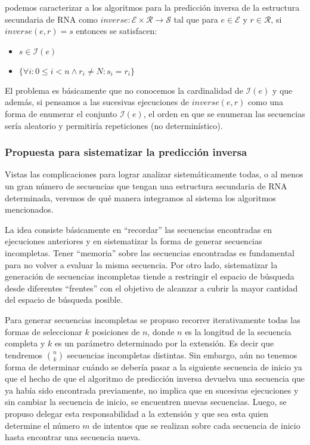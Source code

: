 podemos caracterizar a los algoritmos para la predicci\'on inversa de la
estructura secundaria de \ac{RNA} como $inverse: \mathcal{E} \times \mathcal{R}
\rightarrow \mathcal{S}$ tal que para $e \in \mathcal{E}$ y $r \in
\mathcal{R}$, si $inverse(e,r) = s$ entonces se satisfacen:

\begin{itemize}
  \item $s \in \mathcal{I}(e)$
  \item $\{\forall i : 0 \leq i < n \land r_{i} \neq N : s_{i} = r_{i}\}$ 
\end{itemize}

El problema es b\'asicamente que no conocemos la cardinalidad de
$\mathcal{I}(e)$ y que adem\'as, si pensamos a las sucesivas ejecuciones de
$inverse(e,r)$ como una forma de enumerar el conjunto $\mathcal{I}(e)$, el orden
en que se enumeran las secuencias ser\'ia aleatorio y permitir\'ia repeticiones
(no determin\'istico).

\subsubsection{Propuesta para sistematizar la predicci\'on inversa}

Vistas las complicaciones para lograr analizar sistem\'aticamente todas, o al
menos un gran n\'umero de secuencias que tengan una estructura secundaria de
\ac{RNA} determinada, veremos de qu\'e manera integramos al sistema los
algoritmos mencionados.

La idea consiste b\'asicamente en ``recordar'' las secuencias encontradas en
ejecuciones anteriores y en sistematizar la forma de generar secuencias
incompletas. Tener ``memoria'' sobre las secuencias encontradas es fundamental
para no volver a evaluar la misma secuencia. Por otro lado, sistematizar la
generaci\'on de secuencias incompletas tiende a restringir el espacio de
b\'usqueda desde diferentes ``frentes'' con el objetivo de alcanzar a cubrir la
mayor cantidad del espacio de b\'usqueda posible.

Para generar secuencias incompletas se propuso recorrer iterativamente todas
las formas de seleccionar $k$ posiciones de $n$, donde $n$ es la longitud de la
secuencia completa y $k$ es un par\'ametro determinado por la extensi\'on. Es
decir que tendremos $n \choose k$ secuencias incompletas distintas. Sin
embargo, a\'un no tenemos forma de determinar cu\'ando se deber\'ia pasar a la
siguiente secuencia de inicio ya que el hecho de que el algoritmo de
predicci\'on inversa devuelva una secuencia que ya hab\'ia sido encontrada
previamente, no implica que en sucesivas ejecuciones y sin cambiar la secuencia
de inicio, se encuentren nuevas secuencias. Luego, se propuso delegar esta
responsabilidad a la extensi\'on y que sea esta quien determine el n\'umero $m$
de intentos que se realizan sobre cada secuencia de inicio hasta encontrar una
secuencia nueva.

